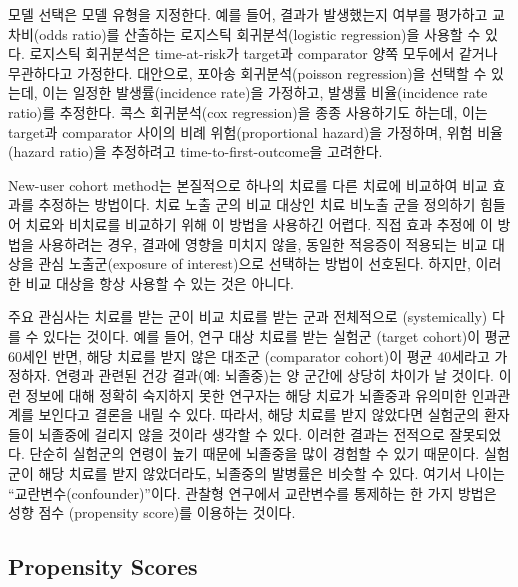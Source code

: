 \documentclass[11pt]{book}
\theoremstyle{definition}
\theoremstyle{definition}
\theoremstyle{definition}
\theoremstyle{remark}
\let\BeginKnitrBlock\begin \let\EndKnitrBlock\end
\begin{document}
모델 선택은 모델 유형을 지정한다. 예를 들어, 결과가 발생했는지 여부를
평가하고 교차비(odds ratio)를 산출하는 로지스틱 회귀분석(logistic
regression)을 사용할 수 있다. 로지스틱 회귀분석은 time-at-risk가
target과 comparator 양쪽 모두에서 같거나 무관하다고 가정한다. 대안으로,
포아송 회귀분석(poisson regression)을 선택할 수 있는데, 이는 일정한
발생률(incidence rate)을 가정하고, 발생률 비율(incidence rate ratio)를
추정한다. 콕스 회귀분석(cox regression)을 종종 사용하기도 하는데, 이는
target과 comparator 사이의 비례 위험(proportional hazard)을 가정하며,
위험 비율(hazard ratio)을 추정하려고 time-to-first-outcome을 고려한다.
 

\BeginKnitrBlock{rmdimportant}
New-user cohort method는 본질적으로 하나의 치료를 다른 치료에 비교하여
비교 효과를 추정하는 방법이다. 치료 노출 군의 비교 대상인 치료 비노출
군을 정의하기 힘들어 치료와 비치료를 비교하기 위해 이 방법을 사용하긴
어렵다. 직접 효과 추정에 이 방법을 사용하려는 경우, 결과에 영향을 미치지
않을, 동일한 적응증이 적용되는 비교 대상을 관심 노출군(exposure of
interest)으로 선택하는 방법이 선호된다. 하지만, 이러한 비교 대상을 항상
사용할 수 있는 것은 아니다.
\EndKnitrBlock{rmdimportant}

주요 관심사는 치료를 받는 군이 비교 치료를 받는 군과 전체적으로
(systemically) 다를 수 있다는 것이다. 예를 들어, 연구 대상 치료를 받는
실험군 (target cohort)이 평균 60세인 반면, 해당 치료를 받지 않은 대조군
(comparator cohort)이 평균 40세라고 가정하자. 연령과 관련된 건강
결과(예: 뇌졸중)는 양 군간에 상당히 차이가 날 것이다. 이런 정보에 대해
정확히 숙지하지 못한 연구자는 해당 치료가 뇌졸중과 유의미한 인과관계를
보인다고 결론을 내릴 수 있다. 따라서, 해당 치료를 받지 않았다면 실험군의
환자들이 뇌졸중에 걸리지 않을 것이라 생각할 수 있다. 이러한 결과는
전적으로 잘못되었다. 단순히 실험군의 연령이 높기 때문에 뇌졸중을 많이
경험할 수 있기 때문이다. 실험군이 해당 치료를 받지 않았더라도, 뇌졸중의
발병률은 비슷할 수 있다. 여기서 나이는 ``교란변수(confounder)''이다.
관찰형 연구에서 교란변수를 통제하는 한 가지 방법은 성향 점수 (propensity
score)를 이용하는 것이다. 

\subsection{Propensity Scores}\label{propensity-scores}

\end{document}
